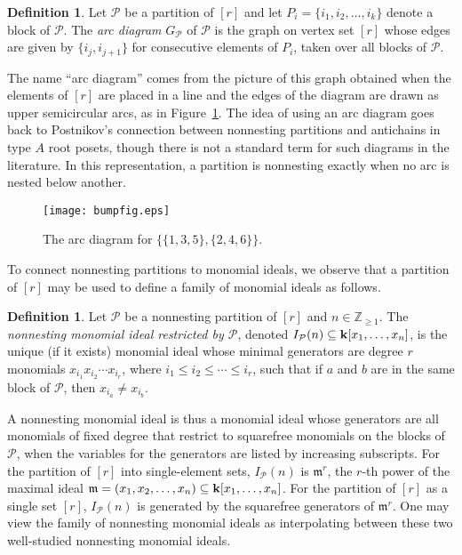 \documentclass[11pt]{amsart}
\theoremstyle{definition}
\newtheorem{definition}[theorem]{Definition}
\numberwithin{equation}{section}
\theoremstyle{remark}
\numberwithin{equation}{section}
\begin{document}
\begin{definition}
Let ${\mathcal{P}}$ be a partition of $[r]$ and let $P_i=\{i_1,i_2,\ldots,i_k\}$ denote a block of ${\mathcal{P}}$.
The \emph{arc diagram} $G_{\mathcal{P}}$ of ${\mathcal{P}}$ is the graph on vertex set $[r]$ whose edges are given by $\{i_j,i_{j+1}\}$ for consecutive elements of $P_i$, taken over all blocks of ${\mathcal{P}}$.
\end{definition}

The name ``arc diagram'' comes from the picture of this graph obtained when the elements of $[r]$ are placed in a line and the edges of the diagram are drawn as upper semicircular arcs, as in Figure~\ref{bumpfig}.
The idea of using an arc diagram goes back to Postnikov's connection between nonnesting partitions and antichains in type $A$ root posets, though there is not a standard term for such diagrams in the literature.
In this representation, a partition is nonnesting exactly when no arc is nested below another.

\begin{figure}[ht]
\begin{center}
\texttt{[image: bumpfig.eps]}
\end{center}
\caption{The arc diagram for $\{\{1,3,5\},\{2,4,6\}\}$.}
\label{bumpfig}
\end{figure}

To connect nonnesting partitions to monomial ideals, we observe that a partition of $[r]$ may be used to define a family of monomial ideals as follows.

\begin{definition}
Let ${\mathcal{P}}$ be a nonnesting partition of $[r]$ and $n\in \mathbb{Z}_{\geq 1}$.
The \emph{nonnesting monomial ideal restricted by ${\mathcal{P}}$}, denoted $I_{\mathcal{P}}(n) \subseteq {{\bf k}}[x_1,\ldots,x_n]$, is the unique (if it exists) monomial ideal whose minimal generators are degree $r$ monomials $x_{i_1}x_{i_2} \cdots x_{i_r}$, where $i_1\leq i_2 \leq\cdots\leq i_r$, such that if $a$ and $b$ are in the same block of ${\mathcal{P}}$, then $x_{i_a}\neq x_{i_b}$.
\end{definition}

A nonnesting monomial ideal is thus a monomial ideal whose generators are all monomials of fixed degree that restrict to squarefree monomials on the blocks of ${\mathcal{P}}$, when the variables for the generators are listed by increasing subscripts.
For the partition of $[r]$ into single-element sets, $I_{\mathcal{P}}(n)$ is $\mathfrak{m}^r$, the $r$-th power of the maximal ideal $\mathfrak{m}=(x_1,x_2,\ldots,x_n)\subseteq {{\bf k}}[x_1,\ldots,x_n]$.
For the partition of $[r]$ as a single set $[r]$, $I_{\mathcal{P}}(n)$ is generated by the squarefree generators of $\mathfrak{m}^r$.
One may view the family of nonnesting monomial ideals as interpolating between these two well-studied nonnesting monomial ideals.
\end{document}
